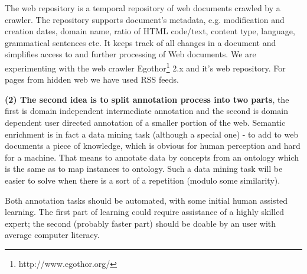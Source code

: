 \documentclass{sig-alternate}
\begin{document}
The web repository is a temporal repository of web documents crawled by a crawler. The repository supports document's metadata, e.g. modification and creation dates, domain name, ratio of HTML code/text, content type, language, grammatical sentences etc. It keeps track of all changes in a document and simplifies access to and further processing of Web documents. We are experimenting with the web crawler Egothor\footnote{http://www.egothor.org/} 2.x and it's web repository. %
For pages from hidden web we have used RSS feeds.





\textbf{(2) The second idea is to split annotation process into two parts}, the first is domain independent intermediate annotation and the second is domain dependent user directed annotation of a smaller portion of the web. Semantic enrichment is in fact a data mining task (although a special one) - to add to web documents a piece of knowledge, which is obvious for human perception and hard for a machine. That means to annotate data by concepts from an ontology which is the same as to map instances to ontology. Such a data mining task will be easier to solve when there is a sort of a repetition (modulo some similarity).\par 
Both annotation tasks should be automated, with some initial human assisted learning. The first part of learning could require assistance of a highly skilled expert; the second (probably faster part) should be doable by an user with average computer literacy. \par
\end{document}
